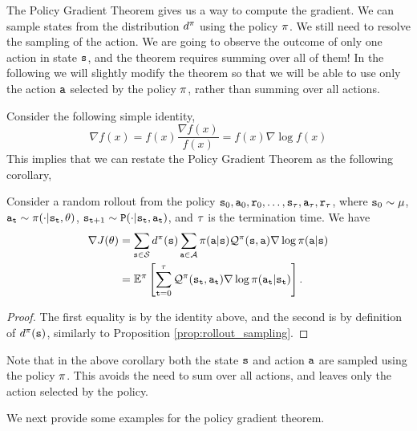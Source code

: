 The Policy Gradient Theorem gives us a way to compute the gradient.
We can sample states from the distribution $d^{\pi}$ using the
policy $\pi$. We still need to resolve the sampling of the
action. We are going to observe the outcome of only one action in
state ${\tt s}$, and the theorem requires summing over all of them!
In the following we will slightly modify the theorem so that we will
be able to use only the action ${\tt a}$ selected by the policy
$\pi$, rather than summing over all actions.

Consider the following simple identity,
\begin{equation}\label{eq:log_likelihood_trick}
\nabla f(x)=f(x)\frac{\nabla f(x)}{f(x)}=f(x)\nabla \log f(x)
\end{equation}
This implies that we can restate the Policy Gradient Theorem as the
following corollary,
\begin{corollary} 
\label{thm:policy-gradient-corr} Consider a random rollout from the policy ${\tt s}_0,{\tt a}_0,{\tt r}_0,\dots,{\tt s}_\tau, {\tt a}_\tau, {\tt r}_\tau$, where ${\tt s}_0 \sim \mu$, ${\tt a}_{\tt t}\sim \pi(\cdot|{\tt s}_{\tt t},\theta)$, ${\tt s}_{{\tt t}+1} \sim {\tt P} (\cdot | {\tt s}_{\tt t}, {\tt a}_{\tt t})$, and $\tau$ is the termination time. We have
\begin{equation*}
\begin{split}
\nabla J(\theta) &= \sum_{{\tt s} \in \mathcal{S}} d^{\pi}({\tt s}) \sum_{{\tt a}\in
\mathcal{A}} \pi({\tt a}|{\tt s}) \mathcal{Q}^\pi
({\tt s},{\tt a}) \nabla \log \pi({\tt a}|{\tt s}) \\
&=\mathbb{E}^\pi\left[\sum_{{\tt t}=0}^{\tau}\mathcal{Q}^\pi ({\tt s}_{\tt t},{\tt a}_{\tt t})\nabla \log
\pi({\tt a}_{\tt t}|{\tt s}_{\tt t})\right].    
\end{split}
\end{equation*}
\end{corollary}
\begin{proof}
    The first equality is by the identity above, and the second is by definition of $d^{\pi}({\tt s})$, similarly to Proposition \ref{prop:rollout_sampling}.
\end{proof}
Note that in the above corollary both the state ${\tt s}$ and action
${\tt a}$ are sampled using the policy $\pi$. This avoids the need to sum over all actions, and leaves only the action selected by the policy.

We next provide some examples for the policy gradient theorem.

